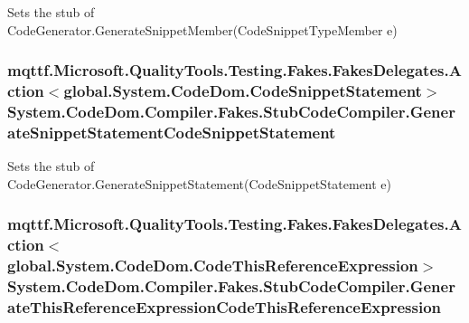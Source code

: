 Sets the stub of Code\-Generator.\-Generate\-Snippet\-Member(\-Code\-Snippet\-Type\-Member e)

\hypertarget{class_system_1_1_code_dom_1_1_compiler_1_1_fakes_1_1_stub_code_compiler_a4a113cd1a071c3c164f4676dfbf47eeb}{
\subsubsection[{Generate\-Snippet\-Statement\-Code\-Snippet\-Statement}]{\setlength{\rightskip}{0pt plus 5cm}mqttf.\-Microsoft.\-Quality\-Tools.\-Testing.\-Fakes.\-Fakes\-Delegates.\-Action$<$global.\-System.\-Code\-Dom.\-Code\-Snippet\-Statement$>$ System.\-Code\-Dom.\-Compiler.\-Fakes.\-Stub\-Code\-Compiler.\-Generate\-Snippet\-Statement\-Code\-Snippet\-Statement}}\label{class_system_1_1_code_dom_1_1_compiler_1_1_fakes_1_1_stub_code_compiler_a4a113cd1a071c3c164f4676dfbf47eeb}


Sets the stub of Code\-Generator.\-Generate\-Snippet\-Statement(\-Code\-Snippet\-Statement e)

\hypertarget{class_system_1_1_code_dom_1_1_compiler_1_1_fakes_1_1_stub_code_compiler_a50e6edc4c36831127bc5a951266b0f07}{
\subsubsection[{Generate\-This\-Reference\-Expression\-Code\-This\-Reference\-Expression}]{\setlength{\rightskip}{0pt plus 5cm}mqttf.\-Microsoft.\-Quality\-Tools.\-Testing.\-Fakes.\-Fakes\-Delegates.\-Action$<$global.\-System.\-Code\-Dom.\-Code\-This\-Reference\-Expression$>$ System.\-Code\-Dom.\-Compiler.\-Fakes.\-Stub\-Code\-Compiler.\-Generate\-This\-Reference\-Expression\-Code\-This\-Reference\-Expression}}\label{class_system_1_1_code_dom_1_1_compiler_1_1_fakes_1_1_stub_code_compiler_a50e6edc4c36831127bc5a951266b0f07}


